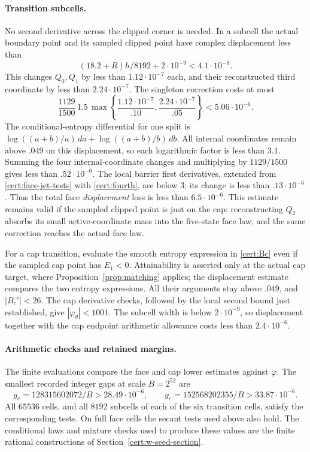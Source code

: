 \documentclass[11pt]{article}
\numberwithin{equation}{section}
\theoremstyle{definition}
\theoremstyle{remark}
\begin{document}
\paragraph{Transition subcells.}
No second derivative across the clipped corner is needed.  In a subcell
the actual boundary point and its sampled clipped point have complex
displacement less than
\[
 (18.2+R)h/8192+2\cdot10^{-9}<4.1\cdot10^{-8}.
\]
This changes $Q_0,Q_1$ by less than $1.12\cdot10^{-7}$ each, and their
reconstructed third coordinate by less than $2.24\cdot10^{-7}$.
The singleton correction costs at most
\[
 \frac{1129}{1500}\,1.5\,
       \max\left\{\frac{1.12\cdot10^{-7}}{.10},
                    \frac{2.24\cdot10^{-7}}{.05}\right\}
       <5.06\cdot10^{-6}.
\]
The conditional-entropy differential for one split is
$\log((a+b)/a)\,da+\log((a+b)/b)\,db$.  All internal coordinates
remain above $.049$ on this displacement, so each logarithmic factor
is less than $3.1$.  Summing the four internal-coordinate changes
and multiplying by $1129/1500$ gives less than $.52\cdot10^{-6}$.
The local barrier first derivatives, extended from
\eqref{cert:face-jet-tests} with \eqref{cert:fourth}, are below 3;
its change is less than $.13\cdot10^{-6}$.  Thus the total face
\emph{displacement} loss is less than $6.5\cdot10^{-6}$.
This estimate remains valid if the sampled clipped point is just on the
cap: reconstructing $Q_2$ absorbs its small active-coordinate mass into
the five-state face law, and the same correction reaches the actual
face law.

For a cap transition, evaluate the smooth entropy expression in
\eqref{cert:Bc} even if the sampled cap point has $E_1<0$.  Attainability
is asserted only at the actual cap target, where Proposition~\ref{prop:matching}
applies; the displacement estimate compares the two entropy expressions.
All their arguments stay above $.049$, and $|B_c'|<26$.  The cap derivative checks, followed by the local second
bound just established, give $|\varphi_\theta|<1001$.  The subcell
width is below $2\cdot10^{-9}$, so displacement together with the cap
endpoint arithmetic allowance costs less than $2.4\cdot10^{-6}$.

\paragraph{Arithmetic checks and retained margins.}
The finite evaluations compare the face and cap lower estimates against
$\varphi$.  The smallest recorded integer gaps at scale $B=2^{52}$ are
\begin{equation}\label{cert:actual-gaps}
 g_e=128315602072/B>28.49\cdot10^{-6},\qquad
 g_c=152568202355/B>33.87\cdot10^{-6}.
\end{equation}
All $65536$ cells, and all $8192$ subcells of each of the six transition
cells, satisfy the corresponding tests.  On full face cells the secant
tests used above also hold.  The conditional laws and mixture checks
used to produce these values are the finite rational constructions of
Section~\ref{cert:w-seed-section}.
\end{document}
